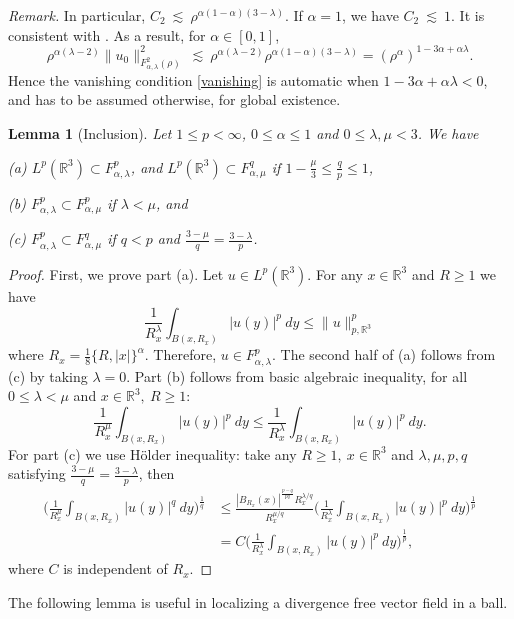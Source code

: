 \documentclass[11pt]{article}
\numberwithin{equation}{section}
\newtheorem{lem}[thm]{Lemma}
\theoremstyle{remark}
\theoremstyle{definition}
\newcommand{\R}{\mathbb{R}}
\newcommand{\lec}{{\ \lesssim \ }}
\newcommand\al{\alpha}
\newcommand\la{\lambda}
\newcommand{\EQN}[1]{\begin{equation*}\begin{split} #1 \end{split}\end{equation*}}
\begin{document}
%

\emph{Remark.} In particular, $C_2 \lec \rho ^{\al(1-\al)(3-\la)}$.
If $\al=1$, we have $C_2 \lec 1$. It is consistent with \cite[Lemma 2.1]{BKT}.
As a result, for $\al \in [0,1]$,
\[
\rho^{\al(\la-2)} \|u_0\|^2_{F^{2}_{\al,\lambda}(\rho)} \lec \rho^{\al(\la-2)}  \rho ^{\al(1-\al)(3-\la)}
= (\rho^\al)^{1-3\al+\al\la}. %
\]
Hence the vanishing condition
\eqref{vanishing} is automatic when $1-3\al+\al\la<0$,
 and has to be assumed otherwise, for global existence.

%
%
%
%
%
%
%
%
%
%
%
%
%
%
%
%


\begin{lem}[Inclusion]\label{inclusion}
Let $1\le p<\infty$, $0 \le \al \le 1$ and $0 \le \la,\mu < 3$.%
We have

(a)
$ L^p(\R^3)\subset F^p_{\al,\la}$, and $ L^p(\R^3)\subset F^q_{\al,\mu}$ if $1-\frac \mu 3 \le \frac qp \le 1$,

(b) $F^p_{\al,\la}\subset F^p_{\al,\mu}$ if $\la<\mu$, and

(c) $F^p_{\al,\la}\subset F^q_{\al,\mu}$ if {$q<p$} and $\frac{3-\mu}q = \frac{3-\la}p$.
\end{lem}

\begin{proof}
First, we prove part (a). Let $u\in L^p(\R^3)$. For any $x\in \R^3$ and $R\ge 1$ we have
\[
\frac{1}{R_x^{\la}}\int_{B(x,R_x)}|u(y)|^p~dy\le \|u\|^p_{p,\R^3}
\]
where $R_x=\frac18\{R,|x|\}^\al$.
Therefore, $u\in F^p_{\al,\la}$. The second half of (a) follows from (c) by taking $\la=0$.
Part (b) follows from basic algebraic inequality, for all $0\le\la<\mu$ and $x\in\R^3,~R\ge 1$:
\[
\frac{1}{R_x^{\mu}}\int_{B(x,R_x)}|u(y)|^p~dy\le \frac{1}{R_x^{\la}}\int_{B(x,R_x)}|u(y)|^p~dy.
\]
For part (c) we use H\"older inequality: take any $R\ge 1,~x\in\R^3$ and $\la,\mu,p,q$ satisfying $\frac{3-\mu}q = \frac{3-\la}p$, then
\EQN{
\Big(\frac{1}{R_x^{\mu}}\int_{B(x,R_x)}|u(y)|^q~dy\Big)^{\frac{1}{q}}
&\le \frac{|B_{R_x}(x)|^{\frac{p-q}{pq}}R_x^{\la/q}}{R_x^{\mu/q}}\Big(\frac{1}{R_x^{\la}}\int_{B(x,R_x)}|u(y)|^p~dy\Big)^{\frac{1}{p}}
\\
&=C\Big(\frac{1}{R_x^{\la}}\int_{B(x,R_x)}|u(y)|^p~dy\Big)^{\frac{1}{p}},
}
where $C$ is independent of $R_x$.
\end{proof}


%

The following lemma is useful in localizing a divergence free vector field in a ball.
\end{document}
